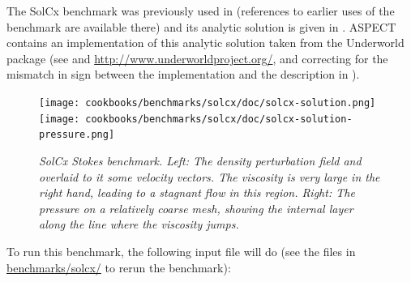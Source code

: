 \documentclass{article}
\newcommand{\aspect}{\textsc{ASPECT}}
\begin{document}
The SolCx benchmark was previously used in \cite[Section 4.1.1]{DMGT11}
(references to earlier uses of the benchmark are available there) and its analytic
solution is given in \cite{Zho96}. \aspect{} contains an implementation of
this analytic solution taken from the Underworld package (see \cite{MQLMAM07}
and \url{http://www.underworldproject.org/}, and correcting for the mismatch
in sign between the implementation and the description in \cite{DMGT11}).

\begin{figure}
  \begin{center}
    \texttt{[image: cookbooks/benchmarks/solcx/doc/solcx-solution.png]}
    \hfill
    \texttt{[image: cookbooks/benchmarks/solcx/doc/solcx-solution-pressure.png]}
    \caption{\it SolCx Stokes benchmark. Left: The density perturbation field
    and overlaid to it some velocity vectors. The viscosity is very large in the
      right hand, leading to a stagnant flow in this region. Right: The
      pressure on a relatively coarse mesh, showing the internal layer along
      the line where the viscosity jumps.}
    \label{fig:solcx}
  \end{center}
\end{figure}

To run this benchmark, the following input file will do (see the files in \url{benchmarks/solcx/} to rerun the benchmark):

\end{document}
